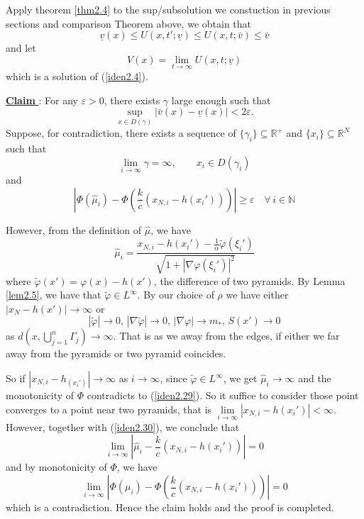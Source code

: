 \documentclass[12pt, a4paper]{article}
\numberwithin{equation}{section}
\newcommand{\N}{\mathbb{N}}
\newcommand{\R}{\mathbb{R}}
\newcommand{\hmu}{\hat{\mu}}
\newcommand{\claim}[1]{\textnormal{\underline{\textbf{Claim #1}}: }}
\begin{document}
\begin{CJK}{UTF8}{bkai}
Apply theorem \ref{thm2.4} to the sup/subsolution we constuction in previous sections and comparison Theorem above, we obtain that
\[
	\underline{v}(x)\leq U(x,t';\underline{v})\leq U(x,t;\bar{v})\leq\bar{v}
\]
and let
\begin{equation}
	V(x)=\lim_{t\to\infty} U(x,t;\underline{v})
\end{equation}
which is a solution of (\ref{iden2.4}). 

\claim{}{For any $\varepsilon>0$, there exists $\gamma$ large enough such that
\[
	\sup_{x\in D(\gamma)}|\bar{v}(x)-\underline{v}(x)|<2\varepsilon.
\]
}
Suppose, for contradiction, there exists a sequence of $\{\gamma_i\}\subseteq\R^+$ and $\{x_i\}\subseteq\R^N$ such that
\begin{equation}
	\lim_{i\to\infty}\gamma=\infty,\quad\quad x_i\in D(\gamma_i)
\end{equation}
and
\begin{equation}\label{iden2.29}
	\left|\Phi(\hmu_i)-\Phi\left(\frac{k}{c}(x_{N,i}-h(x_i'))\right)\right|\geq \varepsilon\quad\forall\, i\in\N
\end{equation}

However, from the definition of $\hmu$, we have
\[
	\hmu_i=\frac{x_{N,i}-h(x_i')-\frac{1}{\alpha}\tilde{\varphi}(\xi_i')}{\sqrt{1+|\nabla\varphi(\xi_i')|^2}}
\]
where $\tilde{\varphi}(x')=\varphi(x)-h(x')$, the difference of two pyramids. By Lemma \ref{lem2.5}, we have that $\tilde{\varphi}\in L^\infty$. By our choice of $\rho$ we have either $|x_N-h(x')|\to\infty$ or
\begin{equation}\label{iden2.30}
	|\tilde{\varphi}|\to0,\,|\nabla\tilde{\varphi}|\to0,\,|\nabla\varphi|\to m_*,\,S(x')\to0
\end{equation}
as $d(x,\bigcup\limits_{j=1}^n\Gamma_j)\to\infty$. That is as we away from the edges, if either we far away from the pyramids or two pyramid coincides.

So if $|x_{N,i}-h_(x_i')|\to\infty$ as $i\to\infty$, since $\tilde{\varphi}\in L^\infty$, we get $\hmu_i\to\infty$ and the monotonicity of $\Phi$ contradicts to (\ref{iden2.29}). So it suffice to consider those point converges to a point near two pyramids, that is $\lim\limits_{i\to\infty}|x_{N,i}-h(x_i')|<\infty$. However, together with (\ref{iden2.30}), we conclude that
\[
	\lim_{i\to\infty}\left|\hat{\mu}_i-\frac{k}{c}(x_{N,i}-h(x_i'))\right|=0
\]
and by monotonicity of $\Phi$, we have
\[
	\lim_{i\to\infty}\left|\Phi(\mu_i)-\Phi\left(\frac{k}{c}(x_{N,i}-h(x_i'))\right)\right|=0
\]
which is a contradiction. Hence the claim holds and the proof is completed.













\end{CJK}
\end{document}

